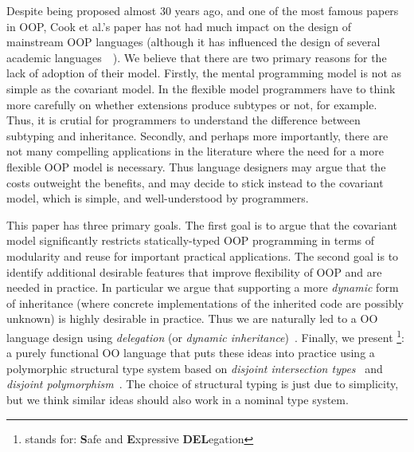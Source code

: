 \begin{comment}
\begin{itemize}

\item {\bf Inheritance and subtyping should be decoupled:} 
That is, there should be different mechanisms for class inheritance 
and class/interface subtyping. 

\item {\bf Extensions do not always produce subtypes:} 
There are cases where classes can inherit from other classes without 
producing subtypes. 

\end{itemize}

\end{comment}

Despite being proposed almost 30 years ago, and one of the most
famous papers in OOP, Cook et al.'s paper has not had much impact 
on the design of mainstream OOP languages (although it has influenced 
the design of several academic languages~\cite{}~).
We believe that there are two primary reasons for the lack of adoption
of their model.  Firstly, the mental programming model is not
as simple as the covariant model. In the flexible model programmers have to
think more carefully on whether extensions produce subtypes or not,
for example.  Thus, it is crutial for programmers to understand the
difference between subtyping and inheritance.
Secondly, and perhaps more importantly, there are not many compelling applications in
the literature where the need for a more flexible OOP model is
necessary. Thus language designers may argue that the costs outweight 
the benefits, and may decide to stick instead to the covariant 
model, which is simple, and well-understood by programmers. 

This paper has three primary goals. The first goal is to argue that the
covariant model significantly restricts statically-typed OOP programming in
terms of modularity and reuse for important practical applications. The second
goal is to identify additional desirable features that improve flexibility of OOP
and are needed in practice. In particular we argue that supporting a more
\emph{dynamic} form of inheritance (where concrete implementations of the
inherited code are possibly unknown) is highly desirable in practice. Thus we
are naturally led to a OO language design using \emph{delegation} (or
\emph{dynamic inheritance})~. Finally, we present \name\footnote{\name
  stands for: {\bf S}afe and {\bf E}xpressive {\bf DEL}egation}: a purely functional OO
language that puts these ideas into practice using a polymorphic structural type
system based on \emph{disjoint intersection types}~\cite{oliveira2016disjoint}
and \emph{disjoint polymorphism}~\cite{alpuimdisjoint}. The choice of structural
typing is just due to simplicity, but we think similar ideas should also work
in a nominal type system.

